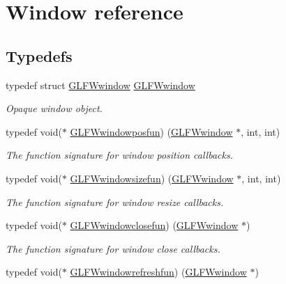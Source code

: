 \hypertarget{group__window}{}\section{Window reference}
\label{group__window}
\subsection*{Typedefs}
\begin{DoxyCompactItemize}
\item 
typedef struct \hyperlink{group__window_ga3c96d80d363e67d13a41b5d1821f3242}{G\+L\+F\+Wwindow} \hyperlink{group__window_ga3c96d80d363e67d13a41b5d1821f3242}{G\+L\+F\+Wwindow}
\begin{DoxyCompactList}\small\item\em Opaque window object. \end{DoxyCompactList}\item 
typedef void($\ast$ \hyperlink{group__window_gafd8db81fdb0e850549dc6bace5ed697a}{G\+L\+F\+Wwindowposfun}) (\hyperlink{group__window_ga3c96d80d363e67d13a41b5d1821f3242}{G\+L\+F\+Wwindow} $\ast$, int, int)
\begin{DoxyCompactList}\small\item\em The function signature for window position callbacks. \end{DoxyCompactList}\item 
typedef void($\ast$ \hyperlink{group__window_gae49ee6ebc03fa2da024b89943a331355}{G\+L\+F\+Wwindowsizefun}) (\hyperlink{group__window_ga3c96d80d363e67d13a41b5d1821f3242}{G\+L\+F\+Wwindow} $\ast$, int, int)
\begin{DoxyCompactList}\small\item\em The function signature for window resize callbacks. \end{DoxyCompactList}\item 
typedef void($\ast$ \hyperlink{group__window_ga93e7c2555bd837f4ed8b20f76cada72e}{G\+L\+F\+Wwindowclosefun}) (\hyperlink{group__window_ga3c96d80d363e67d13a41b5d1821f3242}{G\+L\+F\+Wwindow} $\ast$)
\begin{DoxyCompactList}\small\item\em The function signature for window close callbacks. \end{DoxyCompactList}\item 
typedef void($\ast$ \hyperlink{group__window_ga7a56f9e0227e2cd9470d80d919032e08}{G\+L\+F\+Wwindowrefreshfun}) (\hyperlink{group__window_ga3c96d80d363e67d13a41b5d1821f3242}{G\+L\+F\+Wwindow} $\ast$)

\end{DoxyCompactItemize}
